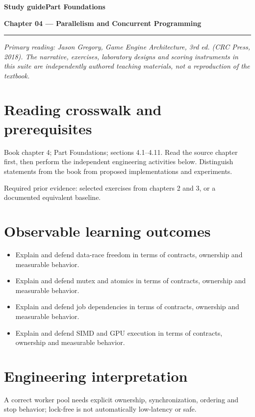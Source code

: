 \documentclass[11pt,letterpaper]{article}
\newcommand{\DocType}{Reference}
\newcommand{\SuiteHeading}[3]{%
\renewcommand{\DocType}{#2}%
{\small\bfseries\sffamily\color{EngineTeal}#2\hfill #3}\par\vspace{6pt}
{\LARGE\bfseries\color{EngineBlue}#1}\par\vspace{4pt}
{\color{EngineTeal}\rule{\linewidth}{1pt}}\par\vspace{7pt}}
\newcommand{\SourceNote}{\footnotesize\textit{Primary reading: Jason Gregory, \emph{Game Engine Architecture}, 3rd ed. (CRC Press, 2018). The narrative, exercises, laboratory designs and scoring instruments in this suite are independently authored teaching materials, not a reproduction of the textbook.}\normalsize\par}
\begin{document}
\SuiteHeading{Chapter 04 — Parallelism and Concurrent Programming}{Study guide}{Part Foundations}
\SourceNote
\section{Reading crosswalk and prerequisites}
Book chapter 4; Part Foundations; sections 4.1--4.11. Read the source chapter first, then perform the independent engineering activities below. Distinguish statements from the book from proposed implementations and experiments.

Required prior evidence: selected exercises from chapters 2 and 3, or a documented equivalent baseline.

\section{Observable learning outcomes}
\begin{itemize}
\item Explain and defend data-race freedom in terms of contracts, ownership and measurable behavior.
\item Explain and defend mutex and atomics in terms of contracts, ownership and measurable behavior.
\item Explain and defend job dependencies in terms of contracts, ownership and measurable behavior.
\item Explain and defend SIMD and GPU execution in terms of contracts, ownership and measurable behavior.
\end{itemize}
\section{Engineering interpretation}
A correct worker pool needs explicit ownership, synchronization, ordering and stop behavior; lock-free is not automatically low-latency or safe.
\end{document}
